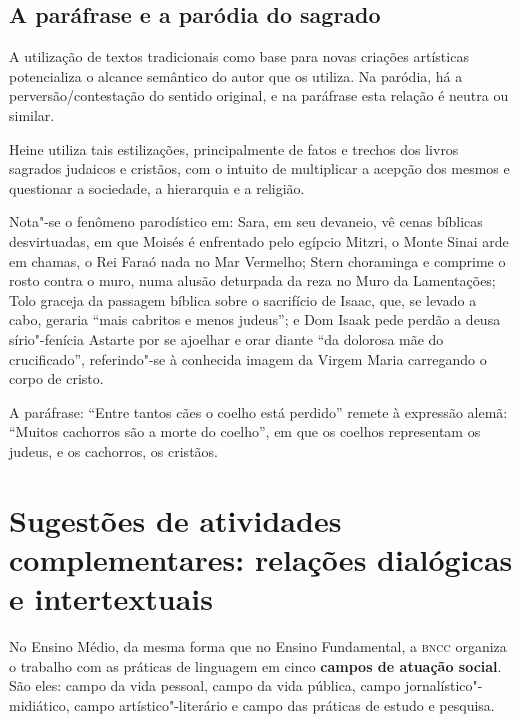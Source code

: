 \documentclass[12pt]{extarticle}
\begin{document}




\subsection{A paráfrase e a paródia do sagrado}

A utilização de textos tradicionais como base para novas criações
artísticas potencializa o alcance semântico do autor que os utiliza. Na
paródia, há a perversão/contestação do sentido original, e na paráfrase
esta relação é neutra ou similar.

Heine utiliza tais estilizações, principalmente de fatos e trechos dos
livros sagrados judaicos e cristãos, com o intuito de multiplicar a
acepção dos mesmos e questionar a sociedade, a hierarquia e a religião.

Nota"-se o fenômeno parodístico em: Sara, em seu devaneio, vê cenas
bíblicas desvirtuadas, em que Moisés é enfrentado pelo egípcio Mitzri, o
Monte Sinai arde em chamas, o Rei Faraó nada no Mar Vermelho; Stern
choraminga e comprime o rosto contra o muro, numa alusão deturpada da
reza no Muro da Lamentações; Tolo graceja da passagem bíblica sobre o
sacrifício de Isaac, que, se levado a cabo, geraria ``mais cabritos e
menos judeus''; e Dom Isaak pede perdão a deusa sírio"-fenícia Astarte
por se ajoelhar e orar diante ``da dolorosa mãe do crucificado'',
referindo"-se à conhecida imagem da Virgem Maria carregando o corpo de
cristo.

A paráfrase: ``Entre tantos cães o coelho está perdido'' remete à
expressão alemã: ``Muitos cachorros são a morte do coelho'', em que os
coelhos representam os judeus, e os cachorros, os cristãos.

\section{Sugestões de atividades complementares: relações dialógicas e
intertextuais}


No Ensino Médio, da mesma forma que no Ensino Fundamental, a \textsc{bncc}
organiza o trabalho com as práticas de linguagem em cinco \textbf{campos
de atuação social}. São eles: campo da vida pessoal, campo da vida
pública, campo jornalístico"-midiático, campo artístico"-literário e campo
das práticas de estudo e pesquisa.
\end{document}
